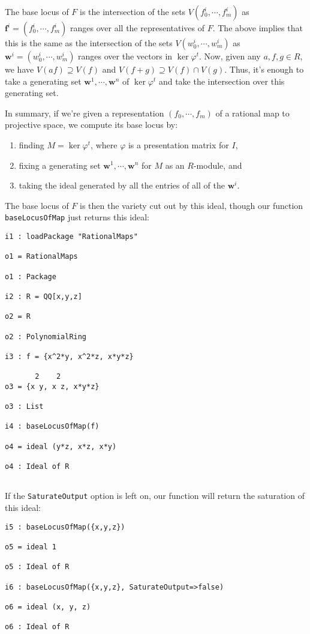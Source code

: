 \documentclass[12pt]{amsart}
\numberwithin{equation}{theorem}
\renewcommand{\:}{\colon}
\theoremstyle{theorem}
\begin{document}
The base locus of $F$ is the intersection of the sets $V(f^i_0, \cdots, f^i_m)$ as $\mathbf{f}^i = (f^i_0, \cdots, f^i_m)$ ranges over all the representatives of $F$. The above implies that this is the same as the intersection of the sets $V(w^i_0,\cdots, w^i_m)$ as $\mathbf{w}^i = (w^i_0, \cdots, w^i_m)$ ranges over the vectors in $\ker \varphi^t$. Now, given any $a, f, g\in R$, we have $V(af) \supseteq V(f)$ and $V(f + g) \supseteq V(f)\cap V(g)$. Thus, it's enough to take a generating set $\mathbf w^1, \cdots, \mathbf w^n$ of $\ker \varphi^t$  and take the intersection over this generating set. 

In summary, if we're given a representation $(f_0, \cdots, f_m)$ of a rational map to projective space, we compute its base locus by:
\begin{enumerate}
  \item finding $M = \ker \varphi^t$, where $\varphi$ is a presentation matrix for $I$,
  \item fixing a generating set $\mathbf w^1, \cdots, \mathbf w^n$ for $M$ as an $R$-module, and
  \item taking the ideal generated by all the entries of all of the $\mathbf w^i$.
\end{enumerate}
The base locus of $F$ is then the variety cut out by this ideal, though our function \verb=baseLocusOfMap= just returns this ideal:

\begin{verbatim}
i1 : loadPackage "RationalMaps"

o1 = RationalMaps

o1 : Package

i2 : R = QQ[x,y,z]

o2 = R

o2 : PolynomialRing

i3 : f = {x^2*y, x^2*z, x*y*z}

       2    2
o3 = {x y, x z, x*y*z}

o3 : List

i4 : baseLocusOfMap(f)

o4 = ideal (y*z, x*z, x*y)

o4 : Ideal of R


\end{verbatim}

 If the \verb=SaturateOutput= option is left on, our function will return the saturation of this ideal:

\begin{verbatim}
i5 : baseLocusOfMap({x,y,z})

o5 = ideal 1

o5 : Ideal of R

i6 : baseLocusOfMap({x,y,z}, SaturateOutput=>false)

o6 = ideal (x, y, z)

o6 : Ideal of R    
\end{verbatim}
\end{document}
